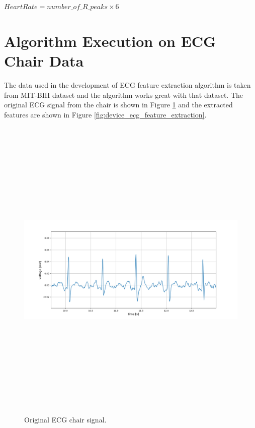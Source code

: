 \begin{center}
	$HeartRate = number\_of\_R\_peaks \times 6$
\end{center}

\section{Algorithm Execution on ECG Chair Data}
The data used in the development of ECG feature extraction algorithm is taken from MIT-BIH dataset and the algorithm works great with that dataset. The original ECG signal from the chair is shown in Figure \ref{fig:device_ecg_orignal} and the extracted features are shown in Figure \ref{fig:device_ecg_feature_extraction}.

\begin{figure}[htpb]
	\centering
	\includegraphics[width=15cm,height=15cm,keepaspectratio=true]{images/device_ecg_orignal}
	\caption{
		Original ECG chair signal.
	}
	\label{fig:device_ecg_orignal}
\end{figure}

